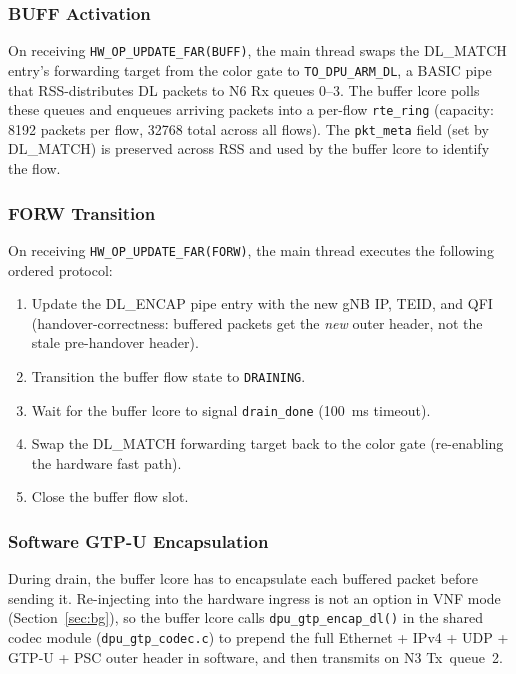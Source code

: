 \documentclass[conference]{IEEEtran}
\newcommand{\code}[1]{\nolinkurl{#1}}
\begin{document}
\subsubsection{BUFF Activation}

On receiving \code{HW_OP_UPDATE_FAR(BUFF)}, the main thread swaps the
DL\_MATCH entry's forwarding target from the color gate to
\texttt{TO\_DPU\_ARM\_DL}, a BASIC pipe that RSS-distributes DL packets to
N6 Rx queues 0--3.  The buffer lcore polls these queues and enqueues arriving
packets into a per-flow \texttt{rte\_ring} (capacity: 8192 packets per flow,
32768 total across all flows).  The \texttt{pkt\_meta} field (set by
DL\_MATCH) is preserved across RSS and used by the buffer lcore to identify
the flow.

\subsubsection{FORW Transition}

On receiving \code{HW_OP_UPDATE_FAR(FORW)}, the main thread executes
the following ordered protocol:

\begin{enumerate}
  \item Update the DL\_ENCAP pipe entry with the new gNB IP, TEID, and QFI
        (handover-correctness: buffered packets get the \emph{new} outer
        header, not the stale pre-handover header).
  \item Transition the buffer flow state to \texttt{DRAINING}.
  \item Wait for the buffer lcore to signal \texttt{drain\_done} (100~ms
        timeout).
  \item Swap the DL\_MATCH forwarding target back to the color gate
        (re-enabling the hardware fast path).
  \item Close the buffer flow slot.
\end{enumerate}

\subsubsection{Software GTP-U Encapsulation}

During drain, the buffer lcore has to encapsulate each buffered packet
before sending it.  Re-injecting into the hardware ingress is not an
option in VNF mode (Section~\ref{sec:bg}), so the buffer lcore calls
\code{dpu_gtp_encap_dl()} in the shared codec module
(\code{dpu_gtp_codec.c}) to prepend the full Ethernet + IPv4 + UDP +
GTP-U + PSC outer header in software, and then transmits on N3
Tx~queue~2.
\end{document}
